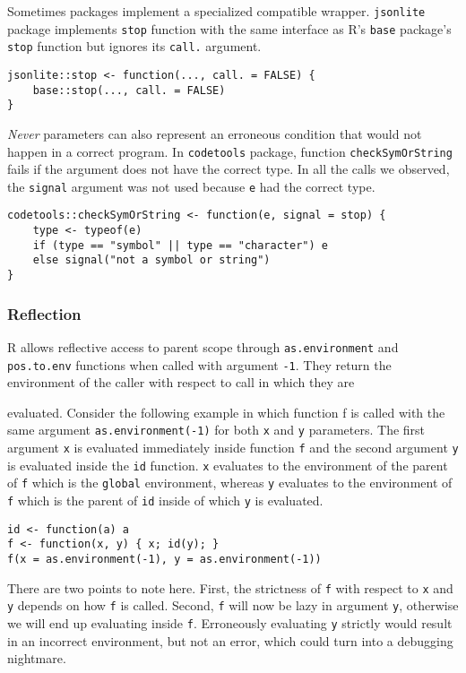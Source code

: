 \documentclass[review,nonacm,screen,acmsmall,anonymous=true]{acmart}
\newcommand{\never}{\emph{Never}\xspace}
\newcommand{\code}[1]{\lstinline[style=R]|#1|\xspace}
\begin{document}
Sometimes packages implement a specialized compatible wrapper.
\code{jsonlite} package implements \code{stop} function with the same interface
as R's \code{base} package's \code{stop} function but ignores its \code{call.}
argument.
\begin{lstlisting}
jsonlite::stop <- function(..., call. = FALSE) {
    base::stop(..., call. = FALSE)
}
\end{lstlisting}

\never parameters can also represent an erroneous condition that would not
happen in a correct program. In \code{codetools} package, function
\code{checkSymOrString} fails if the argument does not have the correct type. In
all the calls we observed, the \code{signal} argument was not used because
\code{e} had the correct type.
\begin{lstlisting}
codetools::checkSymOrString <- function(e, signal = stop) {
    type <- typeof(e)
    if (type == "symbol" || type == "character") e
    else signal("not a symbol or string")
}
\end{lstlisting}

\subsubsection{Reflection}

R allows reflective access to parent scope through \code{as.environment} and
\code{pos.to.env} functions when called with argument \code{-1}.
They return the environment of the caller with respect to call in which they are

evaluated. Consider the following example in which function f is called with the
same argument \code{as.environment(-1)} for both \code{x} and \code{y}
parameters. The first argument \code{x} is evaluated immediately inside
function \code{f} and the second argument \code{y} is evaluated inside the
\code{id} function. \code{x} evaluates to the environment of the parent of
\code{f} which is the \code{global} environment, whereas \code{y} evaluates to
the environment of \code{f} which is the parent of \code{id} inside of which
\code{y} is evaluated.

\begin{lstlisting}
id <- function(a) a
f <- function(x, y) { x; id(y); }
f(x = as.environment(-1), y = as.environment(-1))
\end{lstlisting}

There are two points to note here. First, the strictness of \code{f} with
respect to \code{x} and \code{y} depends on how \code{f} is called. Second,
\code{f} will now be lazy in argument \code{y}, otherwise we will end up
evaluating inside \code{f}. Erroneously evaluating \code{y} strictly would
result in an incorrect environment, but not an error, which could turn into a
debugging nightmare.
\end{document}

